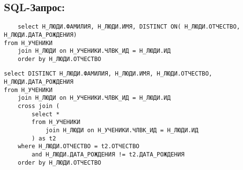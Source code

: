 \subsection{SQL-Запрос:}
\begin{verbatim}
    select Н_ЛЮДИ.ФАМИЛИЯ, Н_ЛЮДИ.ИМЯ, DISTINCT ON( Н_ЛЮДИ.ОТЧЕСТВО, Н_ЛЮДИ.ДАТА_РОЖДЕНИЯ)
from Н_УЧЕНИКИ
    join Н_ЛЮДИ on Н_УЧЕНИКИ.ЧЛВК_ИД = Н_ЛЮДИ.ИД
    order by Н_ЛЮДИ.ОТЧЕСТВО
\end{verbatim}

\begin{verbatim}
select DISTINCT Н_ЛЮДИ.ФАМИЛИЯ, Н_ЛЮДИ.ИМЯ, Н_ЛЮДИ.ОТЧЕСТВО, Н_ЛЮДИ.ДАТА_РОЖДЕНИЯ
from Н_УЧЕНИКИ
    join Н_ЛЮДИ on Н_УЧЕНИКИ.ЧЛВК_ИД = Н_ЛЮДИ.ИД
    cross join (
        select *
        from Н_УЧЕНИКИ
            join Н_ЛЮДИ on Н_УЧЕНИКИ.ЧЛВК_ИД = Н_ЛЮДИ.ИД
        ) as t2
    where Н_ЛЮДИ.ОТЧЕСТВО = t2.ОТЧЕСТВО
        and Н_ЛЮДИ.ДАТА_РОЖДЕНИЯ != t2.ДАТА_РОЖДЕНИЯ
    order by Н_ЛЮДИ.ОТЧЕСТВО
\end{verbatim}